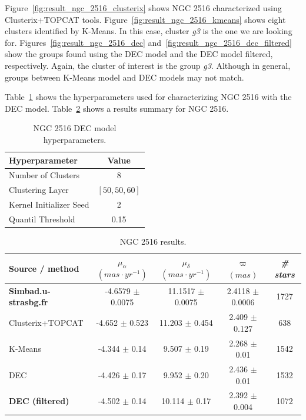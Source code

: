 \documentclass[11pt, a4paper, english]{book}
\begin{document}
\newpage

Figure~\ref{fig:result_ngc_2516_clusterix} shows NGC 2516 characterized using Clusterix+TOPCAT tools.
Figure~\ref{fig:result_ngc_2516_kmeans} shows eight clusters identified by K-Means.
In this case, cluster \emph{g3} is the one we are looking for.
Figures~\ref{fig:result_ngc_2516_dec} and~\ref{fig:result_ngc_2516_dec_filtered}
show the groups found using the DEC model and the DEC model filtered, respectively.
Again, the cluster of interest is the group \emph{g3}.
Although in general, groups between K-Means model and DEC models may not match.

Table~\ref{tab:hyperparameters_ngc_2516} shows the hyperparameters used for characterizing NGC 2516
with the DEC model. Table~\ref{tab:results_ngc_2516} shows a results summary for NGC 2516.

\vfill

\begin{table}[h]
  \begin{center}
    \begin{tabular}{l|c}
      \textbf{Hyperparameter} & \textbf{Value} \\
      \hline
      Number of Clusters & 8 \\
      Clustering Layer & \(\left[ 50, 50, 60 \right]\) \\
      Kernel Initializer Seed & 2 \\
      Quantil Threshold & 0.15 \\
    \end{tabular}
    \caption{NGC 2516 DEC model hyperparameters.}
    \label{tab:hyperparameters_ngc_2516}
  \end{center}
\end{table}

\vfill

\begin{table}[h]
  \begin{center}
    \begin{tabular}{l|c|c|c|c}
      \textbf{Source / method} & \emph{\(\mu_{\alpha}\) \((mas \cdot yr^{-1})\)} & \emph{\(\mu_{\delta}\) \((mas \cdot yr^{-1})\)}
      & \emph{\( \varpi \) \((mas)\)} & \emph{\# stars} \\
      \hline
      \textbf{Simbad.u-strasbg.fr} & -4.6579 \( \pm \) 0.0075 & 11.1517 \( \pm \) 0.0075 & 2.4118 \( \pm \) 0.0006 & 1727 \\
      Clusterix+TOPCAT & -4.652 \( \pm \) 0.523 & 11.203 \( \pm \) 0.454 & 2.409 \( \pm \) 0.127 & 638 \\
      K-Means & -4.344 \( \pm \) 0.14 & 9.507 \( \pm \) 0.19 & 2.268 \( \pm \) 0.01 & 1542 \\
      DEC & -4.426 \( \pm \) 0.17 & 9.952 \( \pm \) 0.20 & 2.436 \( \pm \) 0.01 & 1532 \\
      \textbf{DEC (filtered)} & -4.502 \( \pm \) 0.14 & 10.114 \( \pm \) 0.17 & 2.392 \( \pm \) 0.004 & 1072 \\
    \end{tabular}
    \caption{NGC 2516 results.}
    \label{tab:results_ngc_2516}
  \end{center}
\end{table}
\end{document}
